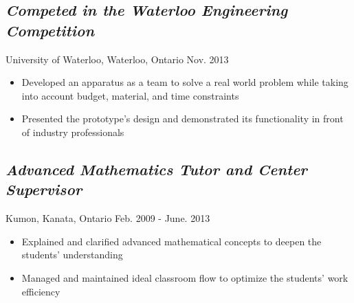 \documentclass[12pt]{article}
\begin{document}
\begin{minipage}[t]{0.8\linewidth}
	\subsection*{\textit{Competed in the Waterloo Engineering Competition}} \vspace{-6pt} 
		University of Waterloo, Waterloo, Ontario \hspace{97pt} Nov. 2013
		\begin{itemize}
			\item Developed an apparatus as a team to solve a real world problem while taking into account budget, 				material, and time constraints
			\item Presented the prototype's design and demonstrated its functionality in front of industry 								professionals
		\end{itemize}	
	
	\subsection*{\textit{Advanced Mathematics Tutor and Center Supervisor}} \vspace{-6pt}
		Kumon, Kanata, Ontario \hspace{119pt} Feb. 2009 - June. 2013
		\begin{itemize}
			\item Explained and clarified advanced mathematical concepts to deepen the students' understanding
			\item Managed and maintained ideal classroom flow to optimize the students' work efficiency
		\end{itemize}
\end{minipage}
\end{document}

